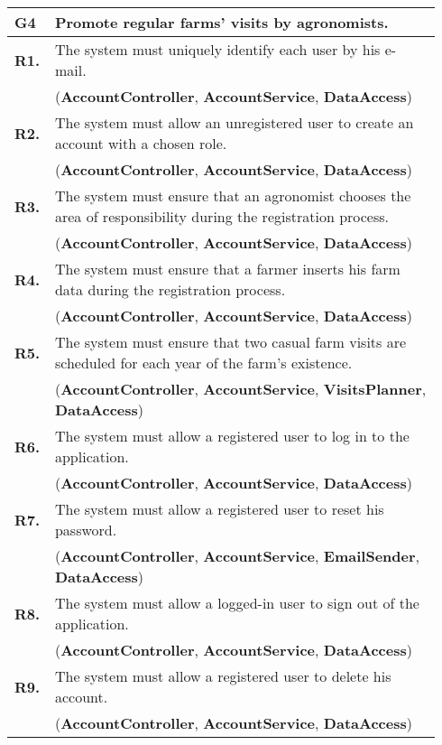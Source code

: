 \begin{longtable}{p{0.06\linewidth} p{0.88\linewidth}} 
    \toprule
    \textbf{G4} & Promote regular farms’ visits by agronomists. \\ 
    \midrule
	\textbf{R1.} & The system must uniquely identify each user by his e-mail. \\
	& (\textbf{AccountController}, \textbf{AccountService}, \textbf{DataAccess})\\
	\textbf{R2.} & The system must allow an unregistered user to create an account with a chosen role. \\
	& (\textbf{AccountController}, \textbf{AccountService}, \textbf{DataAccess})\\
	\textbf{R3.} & The system must ensure that an agronomist chooses the area of responsibility during the registration process. \\
	& (\textbf{AccountController}, \textbf{AccountService}, \textbf{DataAccess})\\
	\textbf{R4.} & The system must ensure that a farmer inserts his farm data during the registration process.\\
	& (\textbf{AccountController}, \textbf{AccountService}, \textbf{DataAccess})\\
	\textbf{R5.} & The system must ensure that two casual farm visits are scheduled for each year of the farm's existence.\\
	& (\textbf{AccountController}, \textbf{AccountService}, \textbf{VisitsPlanner}, \textbf{DataAccess})\\
	\textbf{R6.} & The system must allow a registered user to log in to the application. \\
	& (\textbf{AccountController}, \textbf{AccountService}, \textbf{DataAccess})\\
	\textbf{R7.} & The system must allow a registered user to reset his password. \\
	& (\textbf{AccountController}, \textbf{AccountService}, \textbf{EmailSender}, \textbf{DataAccess})\\
	\textbf{R8.} & The system must allow a logged-in user to sign out of the application. \\
	& (\textbf{AccountController}, \textbf{AccountService}, \textbf{DataAccess}) \todo{stateless?}\\
	\textbf{R9.} & The system must allow a registered user to delete his account. \\
	& (\textbf{AccountController}, \textbf{AccountService}, \textbf{DataAccess})\\
	

\end{longtable}
